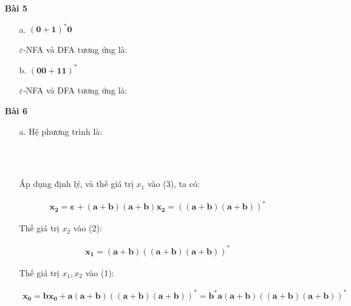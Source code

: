 \documentclass[12pt, a4paper]{article}
\begin{document}
	\begin{itemize}
		
		\item[ \textbf{Bài 5} ]
		
		\begin{itemize}
		
			\item[a.] $\bm{(0 + 1)^*0}$
			
			$\varepsilon$-NFA và DFA tương ứng là:
			
			\vspace{1cm}
			
					
			
			\item[b.] $\bm{(00 + 11)^*}$
			
			$\varepsilon$-NFA và DFA tương ứng là:
			
			\vspace{1cm}
			
					
			
				
		\end{itemize}
		
		\item[ \textbf{Bài 6} ]
		
		\begin{itemize}
		
			\item[a.] Hệ phương trình là:
		
				\begin{numcases}{}
				\\
				\\
				\end{numcases}		
				
				Áp dụng định lý, và thế giá trị $x_1$ vào (3), ta có:
				
				\begin{align*}
				\bm{ x_2 = \varepsilon + (a + b)(a + b)x_2 = ((a + b)(a + b))^* }
				\end{align*}
				
				Thế giá trị $x_2$ vào (2):
				
				\begin{align*}
				\bm{ x_1 = (a + b)((a + b)(a + b))^* }
				\end{align*}
				
				Thế giá trị $x_1, x_2$ vào (1):
				
				\begin{align*}
				\bm{ x_0 = bx_0 + a(a + b)((a + b)(a + b))^*  = b^*a(a + b)((a + b)(a + b))^*}
				\end{align*}
				

\end{itemize}
\end{itemize}
\end{document}
